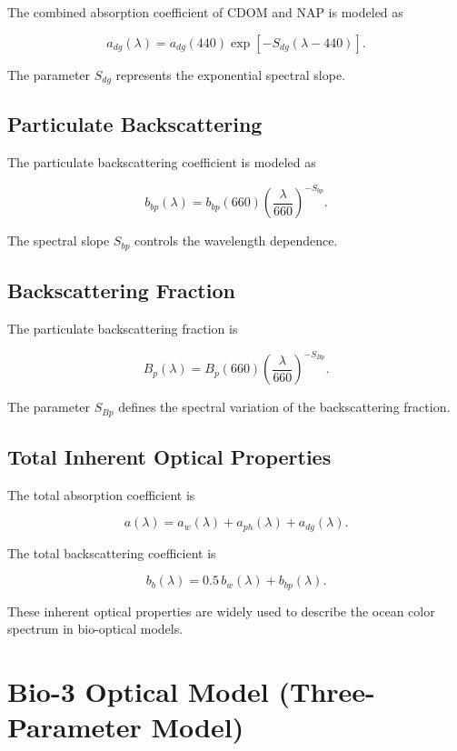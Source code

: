 \documentclass[
  letterpaper,
]{scrbook}
\begin{document}
The combined absorption coefficient of CDOM and NAP is modeled as

\[
a_{dg}(\lambda) =
a_{dg}(440)\exp\!\left[-S_{dg}(\lambda-440)\right].
\]

The parameter \(S_{dg}\) represents the exponential spectral slope.

\subsection{Particulate
Backscattering}\label{particulate-backscattering-1}

The particulate backscattering coefficient is modeled as

\[
b_{bp}(\lambda) =
b_{bp}(660)\left(\frac{\lambda}{660}\right)^{-S_{bp}}.
\]

The spectral slope \(S_{bp}\) controls the wavelength dependence.

\subsection{Backscattering Fraction}\label{backscattering-fraction-1}

The particulate backscattering fraction is

\[
B_p(\lambda) =
B_p(660)\left(\frac{\lambda}{660}\right)^{-S_{Bp}}.
\]

The parameter \(S_{Bp}\) defines the spectral variation of the
backscattering fraction.

\subsection{Total Inherent Optical
Properties}\label{total-inherent-optical-properties}

The total absorption coefficient is

\[
a(\lambda) =
a_w(\lambda) + a_{ph}(\lambda) + a_{dg}(\lambda).
\]

The total backscattering coefficient is

\[
b_b(\lambda) =
0.5\,b_w(\lambda) + b_{bp}(\lambda).
\]

These inherent optical properties are widely used to describe the ocean
color spectrum in bio-optical models.

\section{Bio-3 Optical Model (Three-Parameter
Model)}\label{bio-3-optical-model-three-parameter-model}
\end{document}
